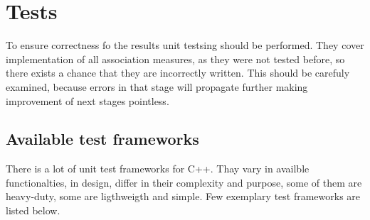 \chapter{Tests}
To ensure correctness fo the results unit testsing should be performed. They cover implementation of all association measures, 
as they were not tested before, so there exists a chance that they are incorrectly written. This should be carefuly examined, 
because errors in that stage will propagate further making improvement of next stages pointless.

\section{Available test frameworks}
There is a lot of unit test frameworks for C++. Thay vary in availble functionalties, in design, differ in their complexity and purpose, 
some of them are heavy-duty, some are ligthweigth and simple. Few exemplary test frameworks are listed below.
